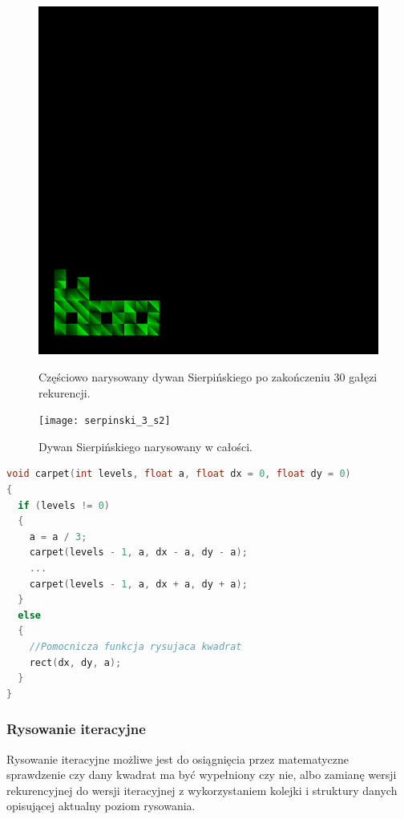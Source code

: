 \begin{figure}[H]
  \begin{minipage}[t]{.45\linewidth}
      \includegraphics[width=\linewidth]{img/serpinski_3_s1.png}
      \caption{Częściowo narysowany dywan Sierpińskiego po zakończeniu 30 gałęzi rekurencji.}
  \end{minipage}
  \hspace{.05\linewidth}
  \begin{minipage}[t]{0.45\linewidth}
      \texttt{[image: serpinski\_3\_s2]}
      \caption{Dywan Sierpińskiego narysowany w całości.}
  \end{minipage}
\end{figure}

\begin{lstlisting}[language=C++, caption=Funkcja rysująca dywan Sierpińskiego rekurencyjnie. Pominięto niektóre wywołania.]
void carpet(int levels, float a, float dx = 0, float dy = 0)
{
  if (levels != 0)
  {
    a = a / 3;
    carpet(levels - 1, a, dx - a, dy - a);
    ...
    carpet(levels - 1, a, dx + a, dy + a);
  }
  else
  {
    //Pomocnicza funkcja rysujaca kwadrat
    rect(dx, dy, a); 
  }
}
\end{lstlisting}
\subsubsection{Rysowanie iteracyjne}
Rysowanie iteracyjne możliwe jest do osiągnięcia przez matematyczne sprawdzenie czy dany kwadrat ma być wypełniony czy nie, albo zamianę wersji rekurencyjnej do wersji iteracyjnej z wykorzystaniem kolejki i struktury danych opisującej aktualny poziom rysowania.


